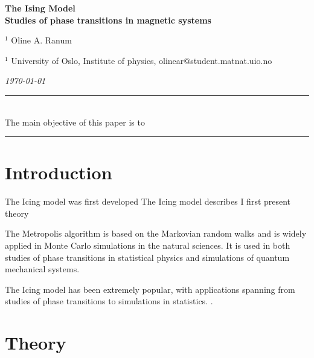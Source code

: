 \documentclass[%
reprint,nofootinbib,
amsmath,amssymb,
aps,
]{revtex4-1}
\newcommand{\HRule}{\rule{\textwidth}{0.5mm}}
\begin{document}
\onecolumngrid

\begin{center}
	\large\textbf{The Ising Model\\ \small{Studies of phase transitions in magnetic systems}}
\end{center}
\vspace{5mm}

\begin{center}
	\small{$^1$ Oline A. Ranum}\\
\end{center}

\begin{center}
	\small{$^1$ University of Oslo, Institute of physics, 
		olinear@student.matnat.uio.no}
\end{center}

\begin{center}
	\textit{\today}
\end{center}
\vspace{7mm}
\noindent 
\HRule \vspace{2mm}\\
The main objective of this paper is to 
\vspace{1.5mm}  \\
\HRule
\vspace{0.3cm}


\section{Introduction} \noindent 
\vspace{3mm}
\twocolumngrid
The Icing model was first developed
The Icing model describes
I first present theory

The Metropolis algorithm is based on the Markovian random walks and is widely applied in Monte Carlo simulations in the natural sciences. It is used in both studies of phase transitions in statistical physics and simulations of quantum mechanical systems.  

The Icing model has been extremely popular, with applications spanning from studies of phase transitions to simulations in statistics. 
 \newpage. \newpage 
\onecolumngrid
\section{Theory} \noindent 
\vspace{3mm}
\twocolumngrid
\end{document}
